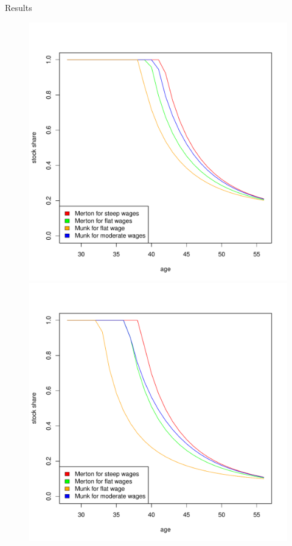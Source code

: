 \documentclass{beamer}
\begin{document}
\begin{frame}[allowframebreaks]{Results}
\begin{itemize}
\begin{figure}
		\includegraphics[scale=0.25]{figs/individuals5.pdf}
		\includegraphics[scale=0.25]{figs/individuals10.pdf}
\end{figure}


\end{itemize}
\end{frame}
\end{document}
